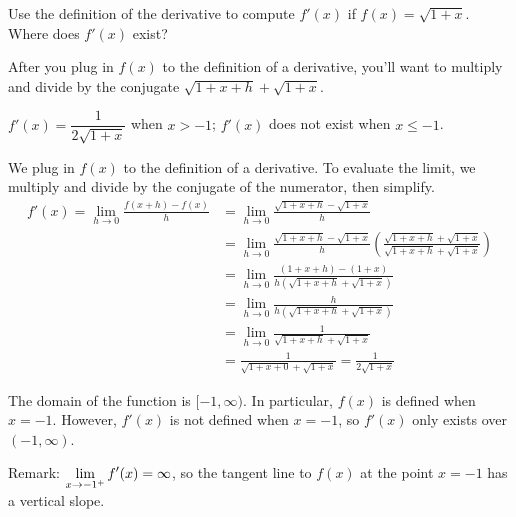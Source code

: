 \begin{question}[2009H]
Use the definition of the derivative to compute
$f'(x)$ if $f(x) = \sqrt{1 + x}$. Where does $f'(x)$ exist?
\end{question}
\begin{hint}
After you plug in $f(x)$ to the definition of a derivative, you'll want to multiply and divide by the conjugate $\sqrt{1+x+h}+\sqrt{1+x}$.
\end{hint}
\begin{answer} $f'(x)=\dfrac{1}{2\sqrt{1+x}}$ when $x>-1$; $f'(x)$ does not exist when $x \leq -1$.
\end{answer}
\begin{solution}
We plug in $f(x)$ to the definition of a derivative. To evaluate the limit, we multiply and divide by the conjugate of the numerator, then simplify.
\begin{align*}
f'(x)=\lim\limits_{h\rightarrow 0}\frac{f(x+h)-f(x)}{h}
&=\lim\limits_{h\rightarrow 0}\frac{\sqrt{1+x+h}-\sqrt{1+x}}{h}\\
&=\lim\limits_{h\rightarrow 0}\frac{\sqrt{1+x+h}-\sqrt{1+x}}{h}
\left(\frac{\sqrt{1+x+h}+\sqrt{1+x}}{\sqrt{1+x+h}+\sqrt{1+x}}\right)\\
&=\lim\limits_{h\rightarrow 0}\frac{(1+x+h)-(1+x)}{h(\sqrt{1+x+h}+\sqrt{1+x})}\\
&=\lim\limits_{h\rightarrow 0}\frac{h}{h(\sqrt{1+x+h}+\sqrt{1+x})}\\
&=\lim\limits_{h\rightarrow 0}\frac{1}{\sqrt{1+x+h}+\sqrt{1+x}}\\
&=\frac{1}{\sqrt{1+x+0}+\sqrt{1+x}}=\frac{1}{2\sqrt{1+x}}
\end{align*}

The domain of the function is $[-1,\infty)$. In particular, $f(x)$ is defined when $x=-1$. However, $f'(x)$ is not defined when $x=-1$, so $f'(x)$ only exists over $(-1,\infty)$.

Remark: $\displaystyle\lim_{x \to -1^+}f'(x)=\infty$, so the tangent line to $f(x)$ at the point $x=-1$ has a vertical slope.
\end{solution}




\subsection*{\Application}


